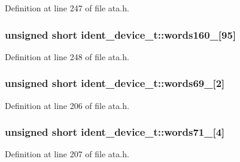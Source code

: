 Definition at line 247 of file ata.\+h.

\subsubsection[{\texorpdfstring{words160\+\_\+255}{words160_255}}]{\setlength{\rightskip}{0pt plus 5cm}unsigned short ident\+\_\+device\+\_\+t\+::words160\+\_\mbox{[}95\mbox{]}}\hypertarget{structident__device__t_a9a4568ee4fc1d39076c9338ab8aa1970}{}\label{structident__device__t_a9a4568ee4fc1d39076c9338ab8aa1970}


Definition at line 248 of file ata.\+h.

\subsubsection[{\texorpdfstring{words69\+\_\+70}{words69_70}}]{\setlength{\rightskip}{0pt plus 5cm}unsigned short ident\+\_\+device\+\_\+t\+::words69\+\_\mbox{[}2\mbox{]}}\hypertarget{structident__device__t_a18de334971e876ab5fb98bbeee82805a}{}\label{structident__device__t_a18de334971e876ab5fb98bbeee82805a}


Definition at line 206 of file ata.\+h.

\subsubsection[{\texorpdfstring{words71\+\_\+74}{words71_74}}]{\setlength{\rightskip}{0pt plus 5cm}unsigned short ident\+\_\+device\+\_\+t\+::words71\+\_\mbox{[}4\mbox{]}}\hypertarget{structident__device__t_ae94ab7c98a95dea40ac23a93b24be1fa}{}\label{structident__device__t_ae94ab7c98a95dea40ac23a93b24be1fa}


Definition at line 207 of file ata.\+h.

